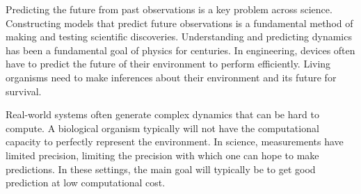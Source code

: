 \documentclass[entropy,article,submit,moreauthors,pdftex,10pt,a4paper]{Definitions/mdpi}
\author{Michael Hahn, Richard Futrell}
\date{2018}
\newif \ifcomment
\newcommand\rljf[1]{\ifcomment{{\color{blue}(#1)}}\else{}\fi}
\begin{document}
\rljf{Small formatting changes I made: \\
* I prefer bold over italics when introducing terms, because when someone is visually scanning the paper looking for a definition, bold stands out much better. \\
* Punctuation should be attached to equations as if they were part of the text (so sometimes periods and commas after equations) \\
* no spaces between m-dashes---like this \\
Also, something crazy is going on with the line numbers!
}



Predicting the future from past observations is a key problem across science.
Constructing models that predict future observations is a fundamental method of making and testing scientific discoveries.
Understanding and predicting dynamics has been a fundamental goal of physics for centuries.
In engineering, devices often have to predict the future of their environment to perform efficiently.
Living organisms need to make inferences about their environment and its future for survival.


Real-world systems often generate complex dynamics that can be hard to compute.
A biological organism typically will not have the computational capacity to perfectly represent the environment.
In science, measurements have limited precision, limiting the precision with which one can hope to make predictions.
In these settings, the main goal will typically be to get good prediction at low computational cost.
\end{document}
